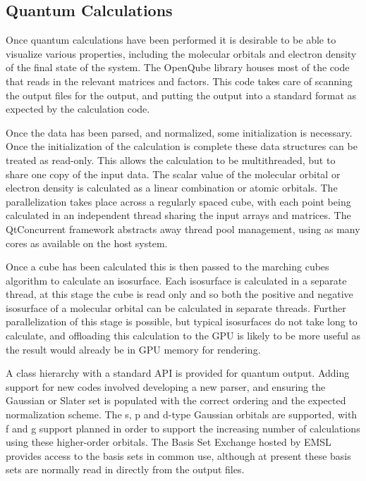 \documentclass[10pt]{bmc_article}
\newenvironment{bmcformat}{\begin{raggedright}
\baselineskip20pt\sloppy\setboolean{publ}{false}}{\end{raggedright}
\baselineskip20pt\sloppy}
\begin{document}
\begin{bmcformat}
\section{Quantum Calculations} %

Once quantum calculations have been performed it is desirable to be able
to visualize various properties, including the molecular orbitals and electron
density of the final state of the system. The OpenQube library houses most of
the code that reads in the relevant matrices and factors. This code takes
care of scanning the output files for the output, and putting the output into a
standard format as expected by the calculation code.

Once the data has been parsed, and normalized, some initialization is
necessary. Once the initialization of the calculation is complete these data
structures can be treated as read-only. This allows the calculation to be
multithreaded, but to share one copy of the input data. The scalar value of
the molecular orbital or electron density is calculated as a linear combination
or atomic orbitals. The parallelization takes place across a regularly spaced
cube, with each point being calculated in an independent thread sharing
the input arrays and matrices. The QtConcurrent framework abstracts away
thread pool management, using as many cores as available on the host system.

Once a cube has been calculated this is then passed to the marching cubes
algorithm to calculate an isosurface. Each isosurface is calculated in a separate
thread, at this stage the cube is read only and so both the positive and negative
isosurface of a molecular orbital can be calculated in separate threads. Further
parallelization of this stage is possible, but typical isosurfaces do not take long
to calculate, and offloading this calculation to the GPU is likely to be more useful
as the result would already be in GPU memory for rendering.

A class hierarchy with a standard API is provided for quantum output. Adding
support for new codes involved developing a new parser, and ensuring the
Gaussian or Slater set is populated with the correct ordering and the expected
normalization scheme. The s, p and d-type Gaussian orbitals are supported,
with f and g support planned in order to support the increasing number of
calculations using these higher-order orbitals. The Basis Set Exchange hosted
by EMSL provides access to the basis sets in common use, although at present
these basis sets are normally read in directly from the output files.


\end{bmcformat}
\end{document}
